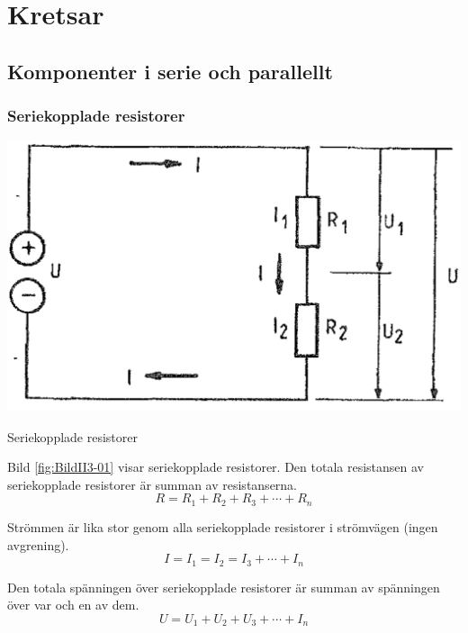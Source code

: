 \chapter{Kretsar}

\section[Serie och parallellt]{Komponenter i serie och parallellt}

\subsection{Seriekopplade resistorer}

\begin{marginfigure}%
  \includegraphics[width=\textwidth]{images/cropped_pdfs/bild_2_3-01.pdf}
  \caption{Seriekopplade resistorer}
  \label{fig:BildII3-01}
\end{marginfigure}

Bild \ref{fig:BildII3-01} visar seriekopplade resistorer.
Den totala resistansen av seriekopplade resistorer är summan av resistanserna.
\[ R = R_1 + R_2 + R_3 + \cdots + R_n \]

Strömmen är lika stor genom alla seriekopplade resistorer i strömvägen (ingen
avgrening).
\[ I = I_1 = I_2 = I_3 + \cdots + I_n \]

Den totala spänningen över seriekopplade resistorer är summan av spänningen över
var och en av dem.
\[ U = U_1 + U_2 + U_3 + \cdots + I_n \]

